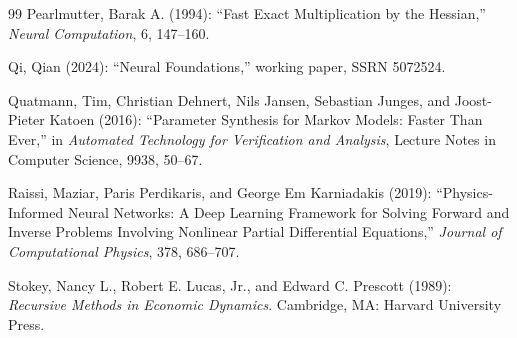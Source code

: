 \begin{thebibliography}{99}
Pearlmutter, Barak A. (1994): ``Fast Exact Multiplication by the Hessian,'' \emph{Neural Computation}, 6, 147--160.

Qi, Qian (2024): ``Neural Foundations,'' working paper, SSRN 5072524.

Quatmann, Tim, Christian Dehnert, Nils Jansen, Sebastian Junges, and Joost-Pieter Katoen (2016): ``Parameter Synthesis for Markov Models: Faster Than Ever,'' in \emph{Automated Technology for Verification and Analysis}, Lecture Notes in Computer Science, 9938, 50--67.

Raissi, Maziar, Paris Perdikaris, and George Em Karniadakis (2019): ``Physics-Informed Neural Networks: A Deep Learning Framework for Solving Forward and Inverse Problems Involving Nonlinear Partial Differential Equations,'' \emph{Journal of Computational Physics}, 378, 686--707.

Stokey, Nancy L., Robert E. Lucas, Jr., and Edward C. Prescott (1989): \emph{Recursive Methods in Economic Dynamics}. Cambridge, MA: Harvard University Press.

\par
\end{thebibliography}
